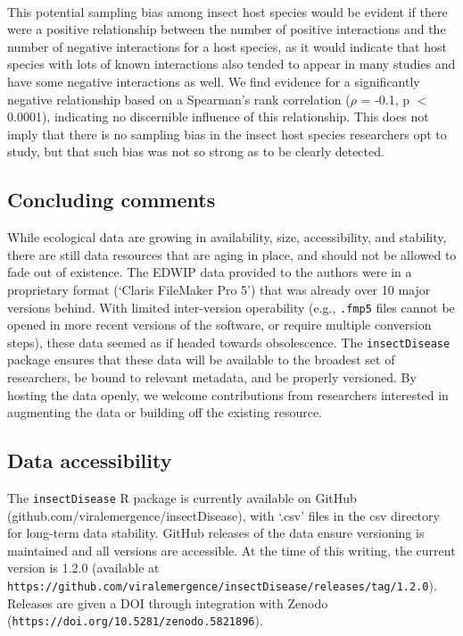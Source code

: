 \documentclass[12pt]{article}
\begin{document}
\paragraph*{}
This potential sampling bias among insect host species would be evident if there were a positive relationship between the number of positive interactions and the number of negative interactions for a host species, as it would indicate that host species with lots of known interactions also tended to appear in many studies and have some negative interactions as well. We find evidence for a significantly negative relationship based on a Spearman's rank correlation ($\rho$ = -0.1, p $<$ 0.0001), indicating no discernible influence of this relationship. This does not imply that there is no sampling bias in the insect host species researchers opt to study, but that such bias was not so strong as to be clearly detected. 



\subsection*{Concluding comments}

While ecological data are growing in availability, size, accessibility, and stability, there are still data resources that are aging in place, and should not be allowed to fade out of existence. The EDWIP data provided to the authors were in a proprietary format (`Claris FileMaker Pro 5') that was already over 10 major versions behind. With limited inter-version operability (e.g., \texttt{.fmp5} files cannot be opened in more recent versions of the software, or require multiple conversion steps), these data seemed as if headed towards obsolescence. The \texttt{insectDisease} package ensures that these data will be available to the broadest set of researchers, be bound to relevant metadata, and be properly versioned. By hosting the data openly, we welcome contributions from researchers interested in augmenting the data or building off the existing resource. 



\subsection*{Data accessibility}
The \texttt{insectDisease} R package is currently available on GitHub \\ (github.com/viralemergence/insectDisease), with `.csv' files in the csv directory for long-term data stability. GitHub releases of the data ensure versioning is maintained and all versions are accessible. At the time of this writing, the current version is 1.2.0 (available at \\ \texttt{https://github.com/viralemergence/insectDisease/releases/tag/1.2.0}). Releases are given a DOI through integration with Zenodo (\texttt{https://doi.org/10.5281/zenodo.5821896}). 
 
\end{document}
